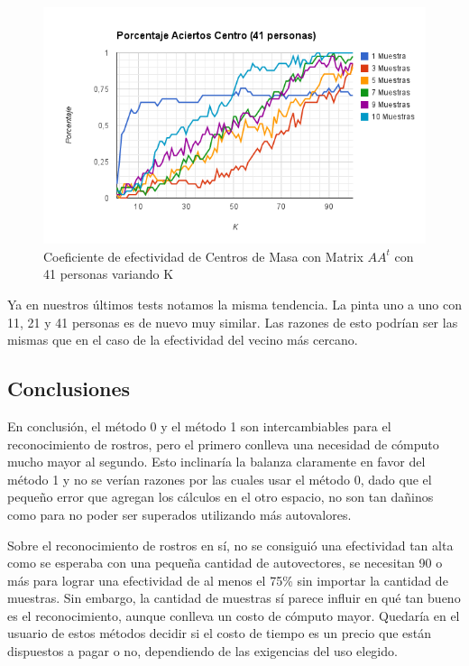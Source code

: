 \begin{figure}[H] \includegraphics[width=1\textwidth]{img/imagef15.png} \caption{Coeficiente de
    efectividad de Centros de Masa  con Matrix $AA^t$ con 41 personas variando K} \end{figure}


Ya en nuestros últimos tests notamos la misma tendencia. La pinta uno a uno con 11, 21 y 41 personas
es de nuevo muy similar. Las razones de esto podrían ser las mismas que en el caso de la efectividad
del vecino más cercano.


\subsection{Conclusiones}

En conclusión, el método 0 y el método 1 son intercambiables para el reconocimiento de rostros, pero
el primero conlleva una necesidad de cómputo mucho mayor al segundo. Esto inclinaría la balanza
claramente en favor del método 1 y no se verían razones por las cuales usar el método 0, dado que el peque\~no error que agregan los c\'alculos en el otro espacio, no son tan da\~ninos como para no poder ser superados utilizando m\'as autovalores.

Sobre el reconocimiento de rostros en sí, no se consiguió una efectividad tan alta como se
esperaba con una peque\~na cantidad de autovectores, se necesitan 90 o más para lograr una efectividad de al menos el 75\% sin importar
la cantidad de muestras. Sin embargo, la cantidad de muestras sí parece influir en qué tan bueno es
el reconocimiento, aunque conlleva un costo de cómputo mayor. Quedaría en el usuario de estos
métodos decidir si el costo de tiempo es un precio que están dispuestos a pagar o no, dependiendo de
las exigencias del uso elegido.

